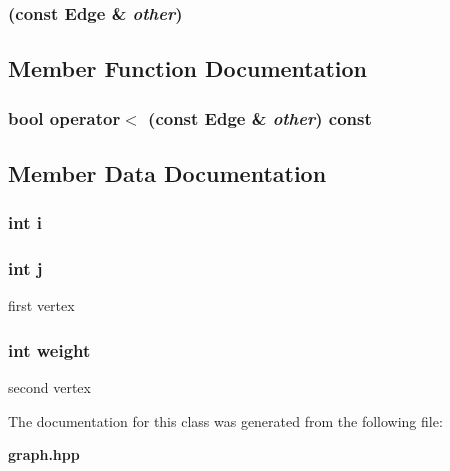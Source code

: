 \subsubsection{ (const {\bf Edge} \& {\em other})\hspace{0.3cm}{\tt  [inline]}}\label{classEdge_a1}




\subsection{Member Function Documentation}
\subsubsection{\setlength{\rightskip}{0pt plus 5cm}bool operator$<$ (const {\bf Edge} \& {\em other}) const\hspace{0.3cm}{\tt  [inline]}}\label{classEdge_a2}




\subsection{Member Data Documentation}
\subsubsection{\setlength{\rightskip}{0pt plus 5cm}int {\bf i}}\label{classEdge_o0}


\subsubsection{\setlength{\rightskip}{0pt plus 5cm}int {\bf j}}\label{classEdge_o1}


first vertex 

\subsubsection{\setlength{\rightskip}{0pt plus 5cm}int {\bf weight}}\label{classEdge_o2}


second vertex 



The documentation for this class was generated from the following file:\begin{CompactItemize}
\item 
{\bf graph.hpp}\end{CompactItemize}
